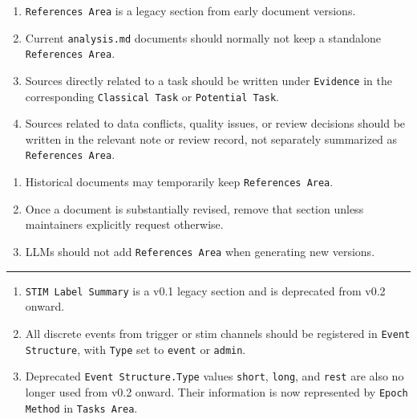 \begin{tcolorbox}
\begin{enumerate}[leftmargin=1.5em,noitemsep,topsep=2pt]
\item \texttt{References Area} is a legacy section from early document versions.
\item Current \texttt{analysis.md} documents should normally not keep a standalone \texttt{References Area}.
\item Sources directly related to a task should be written under \texttt{Evidence} in the corresponding \texttt{Classical Task} or \texttt{Potential Task}.
\item Sources related to data conflicts, quality issues, or review decisions should be written in the relevant note or review record, not separately summarized as \texttt{References Area}.
\end{enumerate}

\smallskip{}\par\smallskip

\begin{enumerate}[leftmargin=1.5em,noitemsep,topsep=2pt]
\item Historical documents may temporarily keep \texttt{References Area}.
\item Once a document is substantially revised, remove that section unless maintainers explicitly request otherwise.
\item LLMs should not add \texttt{References Area} when generating new versions.
\end{enumerate}

\medskip{}
\par\nopagebreak\noindent\rule{\linewidth}{0.4pt}\par\smallskip

\smallskip{}\par\smallskip

\begin{enumerate}[leftmargin=1.5em,noitemsep,topsep=2pt]
\item \texttt{STIM Label Summary} is a v0.1 legacy section and is deprecated from v0.2 onward.
\item All discrete events from trigger or stim channels should be registered in \texttt{Event Structure}, with \texttt{Type} set to \texttt{event} or \texttt{admin}.
\item Deprecated \texttt{Event Structure.Type} values \texttt{short}, \texttt{long}, and \texttt{rest} are also no longer used from v0.2 onward. Their information is now represented by \texttt{Epoch Method} in \texttt{Tasks Area}.
\end{enumerate}


\end{tcolorbox}
